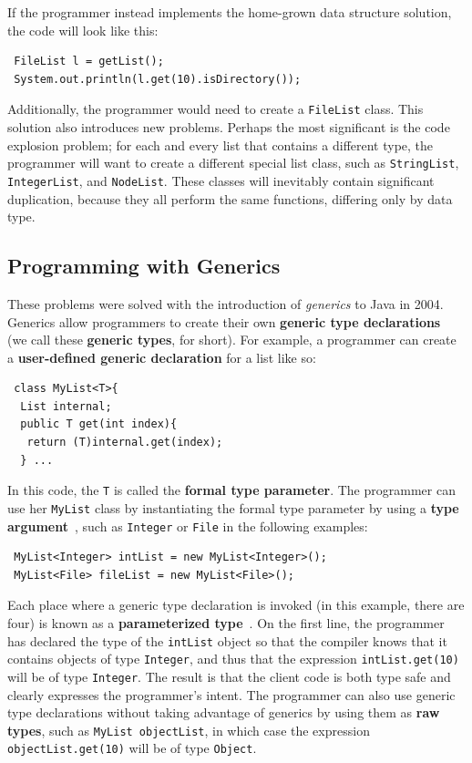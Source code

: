 \documentclass{svjour3}
\newcommand{\code}[1]{\texttt{#1}}
\begin{document}
If the programmer instead implements the home-grown data structure
solution, the code will look like this:

\begin{lstlisting}
 FileList l = getList();
 System.out.println(l.get(10).isDirectory());
\end{lstlisting}

\noindent
Additionally, the programmer would need to create a \code{FileList}
class.
This solution also introduces new problems.
Perhaps the most significant is the code explosion problem; for each and every
list that contains a different type, the programmer will want to create a
different special list class, such as \code{StringList}, \code{IntegerList},
and \code{NodeList}.
These classes will inevitably contain significant duplication, because
they all perform the same functions, differing only by data type.

\subsection{Programming with Generics}\label{sec:progWithGen}

These problems were solved with the 
introduction of \emph{generics} to Java in 2004.
Generics allow programmers to create their own 
\textbf{generic type declarations}~\cite{lesson} 
(we call these \textbf{generic types}, for short).
For example, a programmer can create a 
\textbf{user-defined generic declaration} for a list
like so:

\begin{lstlisting}
 class MyList<T>{
  List internal;
  public T get(int index){
   return (T)internal.get(index);  
  } ...
\end{lstlisting}

\noindent
In this code, the \code{T} is called the 
\textbf{formal type parameter}.
The programmer can use her \code{MyList} class
by instantiating the formal type parameter by using a 
\textbf{type argument}~\cite{lesson},
such as \code{Integer} or \code{File} in the following examples:

\begin{lstlisting}
 MyList<Integer> intList = new MyList<Integer>();
 MyList<File> fileList = new MyList<File>();
\end{lstlisting}

\noindent
Each place where a generic type declaration is invoked (in this example, there are four)
is known as a \textbf{parameterized type}~\cite{tutorial}.
On the first line, the programmer has declared the type of the \code{intList} object so that
the compiler knows that it contains objects of type \code{Integer}, and thus that
the expression \code{intList.get(10)} will be of type \code{Integer}.
The result is that the client code is both type safe and clearly expresses the
programmer's intent.
The programmer can also use generic type declarations without taking advantage
of generics by using them as \textbf{raw types}, such as \code{MyList objectList},
in which case the expression \code{objectList.get(10)} will be of type \code{Object}.
\end{document}
